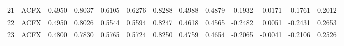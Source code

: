 \begin{tabular}{rlrrrrrrrrrrr}
    21 &   ACFX &  0.4950 &          0.8037 &  0.6105 &            0.6276 &          0.8288 &     0.4988 &      0.4879 &          -0.1932 &         0.0171 &    -0.1761 &                          0.2012 \\
    22 &   ACFX &  0.4950 &          0.8026 &  0.5544 &            0.5594 &          0.8247 &     0.4618 &      0.4565 &          -0.2482 &         0.0051 &    -0.2431 &                          0.2653 \\
    23 &   ACFX &  0.4800 &          0.7830 &  0.5765 &            0.5724 &          0.8250 &     0.4759 &      0.4654 &          -0.2065 &        -0.0041 &    -0.2106 &                          0.2526 \\
\bottomrule
\end{tabular}
